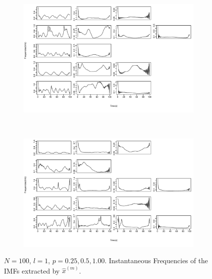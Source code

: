 \documentclass[11pt, a4paper]{article} %
\begin{document}
\begin{figure}
\begin{subfigure}{1.1\textwidth}
  \centering
  \includegraphics[width=\linewidth]{IF_N100_l1_m_1_5.pdf}
  \label{fig:sfig1}
\end{subfigure}\\
\begin{subfigure}{1.1\textwidth}
  \centering
  \includegraphics[width=\linewidth]{IF_N100_l1_m_6_10.pdf}
  \label{fig:sfig2}
\end{subfigure}
\label{fig1}
\caption{$N = 100$, $l = 1$, $p = 0.25, 0.5, 1.00$. Instantaneous Frequencies of the IMFs extracted by $\hat{x}^{(m)}$.}
\end{figure}

\restoregeometry



\end{document}

